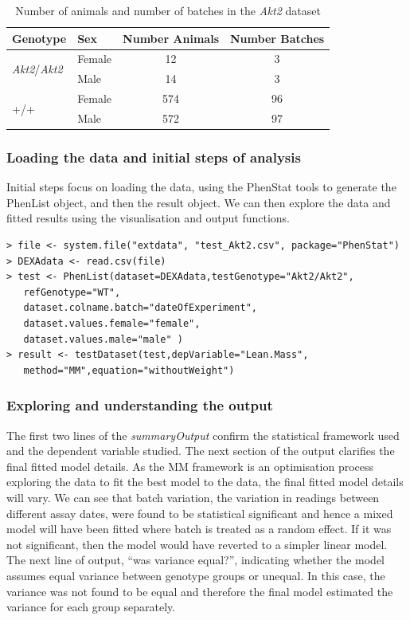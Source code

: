 \documentclass[12pt,a4paper]{article}
\begin{document}
\begin{table}[!h]
\begin{center}
\begin{tabular}{| l | l | c | c |}
  \hline
Genotype&Sex&Number Animals&Number Batches\\\hline
\multirow{2}{*}{\textit{Akt2}\slash \textit{Akt2}}&Female&12&3\\
			    &Male&14&3\\
			    \hline
\multirow{2}{*}{+\slash +}&Female&574&96\\
			    &Male&572&97\\

\hline  
\end{tabular}
\caption{Number of animals and number of batches in the \textit{Akt2} dataset}\label{table:08}
\end{center}
\end{table}

\subsubsection{Loading the data and initial steps of analysis}
Initial steps focus on loading the data, using the PhenStat tools to generate the PhenList object, and then the result object.  
We can then explore the data and fitted results using the visualisation and output functions. 

  
\begingroup
    \fontsize{8pt}{12pt}\selectfont
\begin{verbatim}
> file <- system.file("extdata", "test_Akt2.csv", package="PhenStat") 
> DEXAdata <- read.csv(file)
> test <- PhenList(dataset=DEXAdata,testGenotype="Akt2/Akt2",  
   refGenotype="WT",
   dataset.colname.batch="dateOfExperiment", 
   dataset.values.female="female", 
   dataset.values.male="male" )
> result <- testDataset(test,depVariable="Lean.Mass",
   method="MM",equation="withoutWeight")
\end{verbatim}
\endgroup 



\subsubsection{Exploring and understanding the output}
\label{cs1_output}
The first two lines of the \textit{summaryOutput} confirm the statistical framework used and the dependent variable studied.   
The next section of the output clarifies the final fitted model details. As the MM framework is an optimisation process exploring the data to fit the best model to the data, 
the final fitted model details will vary. We can see that batch variation, the variation in readings between different assay dates, 
were found to be statistical significant and hence a mixed model will have been fitted where batch is treated as a random effect.  
If it was not significant, then the model would have reverted to a simpler linear model.  
The next line of output, “was variance equal?”, indicating whether the model assumes equal variance between genotype groups or unequal.  
In this case, the variance was not found to be equal and therefore the final model estimated the variance for each group separately. 
\end{document}
